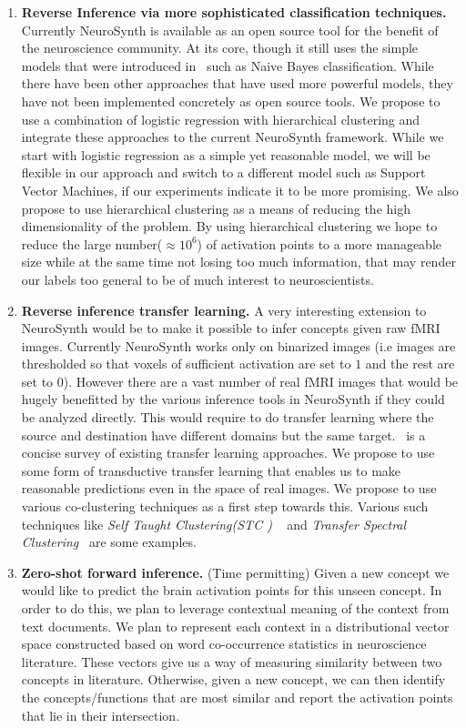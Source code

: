 \documentclass[11pt]{article}
\begin{document}
\begin{enumerate}

    \item {\bf Reverse Inference via more sophisticated classification techniques.} Currently NeuroSynth is available as an open source tool for the benefit of the neuroscience community. At its core, though it still uses the simple models that were introduced in~\cite{yarkoni2011large} such as Naive Bayes classification. While there have been other approaches that have used more powerful models, they have not been implemented concretely as open source tools. We propose to use a combination of logistic regression with hierarchical clustering and integrate these approaches to the current NeuroSynth framework. While we start with logistic regression as a simple yet reasonable model, we will be flexible in our approach and switch to a different model such as Support Vector Machines, if our experiments indicate it to be more promising. We also propose to use hierarchical clustering as a means of reducing the high dimensionality of the problem. By using hierarchical clustering we hope to reduce the large number($\approx 10^6$) of activation points to a more manageable size while at the same time not losing too much information, that may render our labels too general to be of much interest to neuroscientists.

    \item {\bf Reverse inference transfer learning.} A very interesting extension to NeuroSynth would be to make it possible to infer concepts given raw fMRI images. Currently NeuroSynth works only on binarized images (i.e images are thresholded so that voxels of sufficient activation are set to $1$ and the rest are set to $0$). However there are a vast number of real fMRI images that would be hugely benefitted by the various inference tools in NeuroSynth if they could be analyzed directly. This would require to do transfer learning where the source and destination have different domains but the same target.~\cite{pan2010survey,taylor2009transfer} is a concise survey of existing transfer learning approaches. We propose to use some form of transductive transfer learning that enables us to make reasonable predictions even in the space of real images. We propose to use various co-clustering techniques as a first step towards this. Various such techniques like \emph{Self Taught Clustering(STC )} ~\cite{dai2008self} and \emph{Transfer Spectral Clustering}~\cite{jiang2012transfer} are some examples.

    \item {\bf Zero-shot forward inference.}
 (Time permitting)  Given a new concept we would like to predict the brain activation points for this unseen concept. In order to do this, we plan to leverage contextual meaning of the context from text documents. We plan to represent each context in a distributional vector space constructed based on word co-occurrence statistics in neuroscience literature. These vectors give us a way of measuring similarity between two concepts in literature. Otherwise, given a new concept, we can then identify the concepts/functions that are most similar and report the activation points that lie in their intersection.


\end{enumerate}
\end{document}
